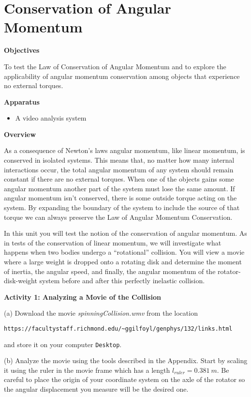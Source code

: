 
\section{Conservation of Angular Momentum}

\makelabheader %

\textbf{Objectives} 

To test the Law of Conservation of Angular Momentum and to explore the applicability
of angular momentum conservation among objects that experience no external torques. 

\textbf{Apparatus}

\begin{itemize}
\item A video analysis system
\end{itemize}
\textbf{Overview }

As a consequence of Newton's laws angular momentum, like linear momentum, is
conserved in isolated systems. This means that, no matter how
many internal interactions occur, the total angular momentum of any system should 
remain constant if there are no external torques. 
When one of the objects gains some angular momentum another part of the system must lose the same amount. 
If angular momentum isn't conserved, there is some outside torque acting on the system. 
By expanding the boundary of the system to include the source of that torque we 
can always preserve the Law of Angular Momentum Conservation. 

In this unit you will test the notion of the conservation of angular momentum.
As in tests of the conservation of linear momentum, we will investigate what
happens when two bodies undergo a ``rotational'' collision.
You will view a movie where a large weight is dropped onto a rotating disk and determine the moment of
inertia, the angular speed, and finally, the angular momentum of the rotator-disk-weight
system before and after this perfectly inelastic collision.

\textbf{Activity 1: Analyzing a Movie of the Collision} 

(a) Download the movie {\it spinningCollision.wmv} from the location\raggedright

{\verb!https://facultystaff.richmond.edu/~ggilfoyl/genphys/132/links.html!}

\noindent and store it on your computer {\tt Desktop}.

(b) Analyze the movie using the tools described in the Appendix. Start by scaling it using 
the ruler in the movie frame which has a length $l_{ruler} = 0.381~m$.
Be careful to place the origin of your coordinate system on the axle of the
rotator so the angular displacement you measure will be the desired one.

